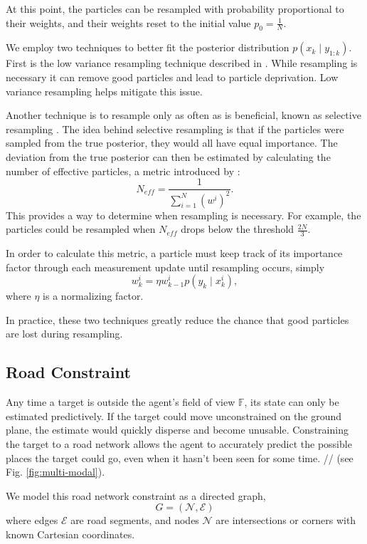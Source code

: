 \documentclass[letterpaper, 10 pt, conference]{ieeeconf}  %
\begin{document}
At this point, the particles can be resampled with probability proportional to their weights, and their weights reset to the initial value $p_0 = \frac{1}{N}$.

We employ two techniques to better fit the posterior distribution $p(x_k \mid y_{1:k})$. First is the low variance resampling technique described in \cite{Thrun2006}. While resampling is necessary it can remove good particles and lead to particle deprivation. Low variance resampling helps mitigate this issue.

Another technique is to resample only as often as is beneficial, known as selective resampling \cite{Grisetti2005}. The idea behind selective resampling is that if the particles were sampled from the true posterior, they would all have equal importance. The deviation from the true posterior can then be estimated by calculating the number of effective particles, a metric introduced by \cite{Liu1996}:
\begin{equation}%
N_{eff} = \frac{1}{\sum_{i=1}^N (w^i)^2}.
\end{equation}
This provides a way to determine when resampling is necessary. For example, the particles could be resampled when $N_{eff}$ drops below the threshold $\frac{2N}{3}$.

In order to calculate this metric, a particle must keep track of its importance factor through each measurement update until resampling occurs, simply
\begin{equation}%
    w^i_k = \eta w^i_{k-1} p(y_k \mid x^i_k),
\end{equation}
where $\eta$ is a normalizing factor.

In practice, these two techniques greatly reduce the chance that good particles are lost during resampling.

\subsection{Road Constraint}

Any time a target is outside the agent's field of view $\mathbb{F}$, its state can only be estimated predictively. If the target could move unconstrained on the ground plane, the estimate would quickly disperse and become unusable. Constraining the target to a road network allows the agent to accurately predict the possible places the target could go, even when it hasn't been seen for some time. // (see Fig. \ref{fig:multi-modal}).

We model this road network constraint as a directed graph,
\begin{equation}%
    G = (\mathcal{N}, \mathcal{E})
\end{equation}
where edges $\mathcal{E}$ are road segments, and nodes $\mathcal{N}$ are intersections or corners with known Cartesian coordinates.
\end{document}

